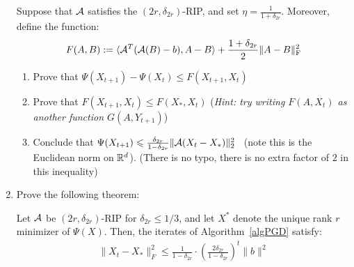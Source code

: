 \documentclass[12pt]{article}
\begin{document}
\begin{enumerate}
		Suppose that ${\cal A}$ satisfies the $(2r,\delta_{2r})$-RIP, and set $\eta = \frac{1}{1+\delta_{2r}}$. Moreover, define the function:
		\begin{eqnarray}
		F(A,B) := \langle {\cal A}^T({\cal A}(B) - b), A - B \rangle + \frac{1+\delta_{2r}}{2}\| A- B\|_{\mathrm{F}}^2
		\end{eqnarray}
		\begin{enumerate}
			\item Prove that $\Psi(X_{t+1}) - \Psi(X_t) \le F(X_{t+1},X_t)$
			\item Prove that $F(X_{t+1},X_t) \le F(X_*,X_t)$ (\emph{Hint: try writing $F(A,X_t)$ as another function $G(A,Y_{t+1})$})
			\item Conclude that $\Psi(X_{t+1}) \leqslant \frac{\delta_{2r}}{1-\delta_{2r}}\|{\cal A}(X_t - X_*)\|_{2}^2$~ (note this is the Euclidean norm on $\mathbb{R}^d$). (There is no typo, there is no extra factor of $2$ in this inequality)
		\end{enumerate}

		\item Prove the following theorem:
		\begin{theorem*} Let ${\cal A}$ be $(2r,\delta_{2r})$-RIP for $\delta_{2r} \le 1/3$, and let $X^*$ denote the unique rank $r$ minimizer of $\Psi(X)$. Then, the iterates of Algorithm~\ref{algPGD} satisfy:
		\begin{eqnarray}
		\|X_t - X_*\|_F^2 \le \frac{1}{1-\delta_{2r}} \cdot \left(\frac{2\delta_{2r}}{1-\delta_{2r}}\right)^{t} \|b\|^2
		\end{eqnarray}
		\end{theorem*}
	\end{enumerate}

\newpage
\end{document}
